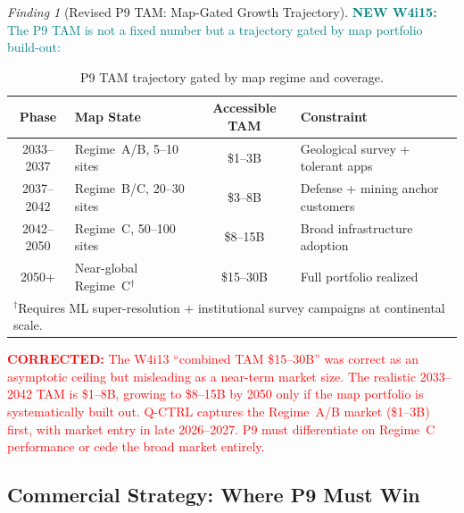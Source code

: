 \documentclass[11pt]{article}
\theoremstyle{definition}
\theoremstyle{remark}
\newtheorem{finding}[theorem]{Finding}
\newcommand{\corrected}[1]{\textcolor{red}{\textbf{CORRECTED:} #1}}
\newcommand{\newfinding}[1]{\textcolor{teal}{\textbf{NEW W4i15:} #1}}
\begin{document}
\begin{finding}[Revised P9 TAM: Map-Gated Growth Trajectory]
\label{find:tam-revised}
\newfinding{The P9 TAM is not a fixed number but a trajectory gated
by map portfolio build-out:}

\begin{table}[H]
\centering
\caption{P9 TAM trajectory gated by map regime and coverage.}
\label{tab:tam-trajectory}
\begin{tabular}{@{}clcl@{}}
\toprule
Phase & Map State & Accessible TAM & Constraint \\
\midrule
2033--2037 & Regime~A/B, 5--10 sites & \$1--3B &
  Geological survey + tolerant apps \\
2037--2042 & Regime~B/C, 20--30 sites & \$3--8B &
  Defense + mining anchor customers \\
2042--2050 & Regime~C, 50--100 sites & \$8--15B &
  Broad infrastructure adoption \\
2050+ & Near-global Regime~C$^\dagger$ & \$15--30B &
  Full portfolio realized \\
\bottomrule
\multicolumn{4}{l}{\small $^\dagger$Requires ML super-resolution +
  institutional survey campaigns at continental scale.}
\end{tabular}
\end{table}

\corrected{The W4i13 ``combined TAM \$15--30B'' was correct as an
asymptotic ceiling but misleading as a near-term market size. The
realistic 2033--2042 TAM is \$1--8B, growing to \$8--15B by 2050
only if the map portfolio is systematically built out. Q-CTRL captures
the Regime~A/B market (\$1--3B) first, with market entry in late
2026--2027. P9 must differentiate on Regime~C performance or cede
the broad market entirely.}
\end{finding}

\subsection{Commercial Strategy: Where P9 Must Win}
\end{document}
